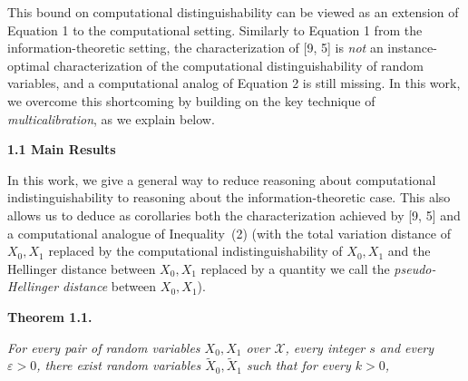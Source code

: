 \documentclass[10pt,a4paper]{article}
\begin{document}
This bound on computational distinguishability can be viewed as an extension of Equation 1 to the computational setting. Similarly to Equation 1 from the information-theoretic setting, the characterization of [9, 5] is \emph{not} an instance-optimal characterization of the computational distinguishability of random variables, and a computational analog of Equation 2 is still missing. In this work, we overcome this shortcoming by building on the key technique of \emph{multicalibration}, as we explain below.\par




\par\medskip\noindent\textbf{
1.1 Main Results}\par




In this work, we give a general way to reduce reasoning about computational indistinguishability to reasoning about the information-theoretic case. This also allows us to deduce as corollaries both the characterization achieved by [9, 5] and a computational analogue of Inequality (2) (with the total variation distance of $X_{0},X_{1}$ replaced by the computational indistinguishability of $X_{0},X_{1}$ and the Hellinger distance between $X_{0},X_{1}$ replaced by a quantity we call the \emph{pseudo-Hellinger distance} between $X_{0},X_{1}$).\par





\par\medskip\noindent\textbf{
\textbf{Theorem 1.1}\textbf{.}
}\par



\emph{For every pair of random variables $X_{0},X_{1}$ over $\mathcal{X}$, every integer $s$ and every $\varepsilon>0$, there exist random variables $\widetilde{X}_{0},\widetilde{X}_{1}$ such that for every $k>0$,}\par
\end{document}
